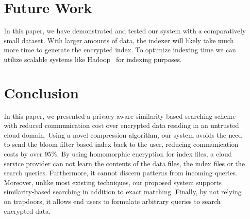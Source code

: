 \section{Future Work}
\label{sec:futurework}

In this paper, we have demonstrated and tested our system with a comparatively 
small dataset. With larger amounts of data, the indexer will likely take 
much more time to generate the
encrypted index. To optimize indexing time we can
utilize scalable systems like Hadoop~\cite{hadoop} for indexing
purposes.

\section{Conclusion}
\label{sec:conclusion}

In this paper, we presented a privacy-aware similarity-based searching scheme
with reduced communication cost over encrypted data residing in an untrusted
cloud domain. Using a novel compression 
algorithm, our system avoids the need to send the bloom filter based index back to the 
user, reducing communication costs by over 95\%.
By using homomorphic encryption for index files, a cloud service provider can not 
learn the contents of 
the data files, the index files or the search queries. Furthermore, it cannot 
discern patterns from incoming queries. Moreover, unlike most existing techniques, our
proposed system supports similarity-based searching in addition to exact matching.
Finally, by not relying on trapdoors, it allows end users to formulate
arbitrary queries to search encrypted data.

